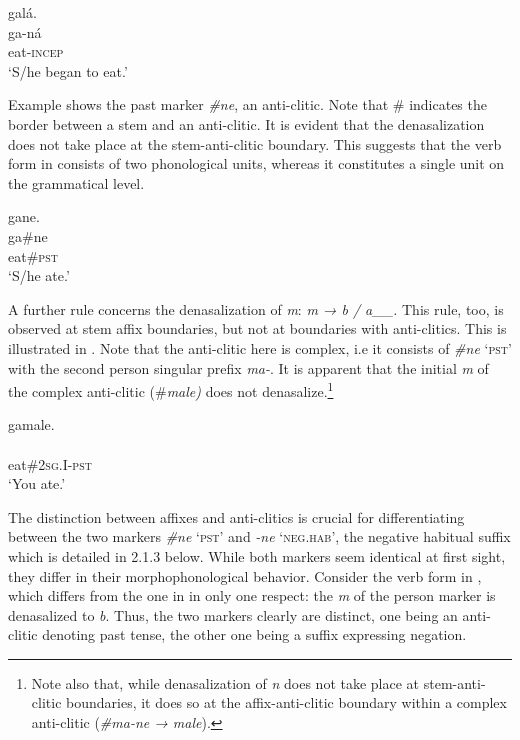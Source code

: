 \documentclass[output=paper,colorlinks,citecolor=brown]{langscibook}
\begin{document}
\ea\label{ex:kog:1} {galá}.\\    
    \gll ga-ná\\
        eat-\textsc{incep}\\
    \glt‘S/he began to eat.'
\z 

Example  shows the past marker \textit{\#ne}, an anti-clitic. Note that \# indicates the border between a stem and an anti-clitic. It is evident that the denasalization does not take place at the stem-anti-clitic boundary. This suggests that the verb form in  consists of two phonological units, whereas it constitutes a single unit on the grammatical level.

\ea\label{ex:kog:2}{gane}.\\
    \gll ga\#ne\\
         eat\#\textsc{pst}\\
    \glt  ‘S/he ate.’
\z 

A further rule concerns the denasalization of \textit{m}: \textit{m → b / a\_\_.} This rule, too, is observed at stem affix boundaries, but not at boundaries with anti-clitics. This is illustrated in . Note that the anti-clitic here is complex, i.e it consists of \textit{\#ne} ‘\textsc{pst’} with the second person singular prefix \textit{ma-}. It is apparent that the initial \textit{m} of the complex anti-clitic (\#\textit{male)} does not denasalize.\footnote{Note also that, while denasalization of \textit{n} does not take place at stem-anti-clitic boundaries, it does so at the affix-anti-clitic boundary within a complex anti-clitic (\textit{\#ma-ne → male}).}

\ea\label{ex:kog:3}{gamale}.\\
    \\
         eat\#2\textsc{sg.I-pst}\\
    \glt  ‘You ate.’
\z 

The distinction between affixes and anti-clitics is crucial for differentiating between the two markers \textit{\#ne} ‘\textsc{pst’} and \textit{{}-ne} ‘\textsc{neg.hab}’, the negative habitual suffix which is detailed in 2.1.3 below. While both markers seem identical at first sight, they differ in their morphophonological behavior. Consider the verb form in , which differs from the one in  in only one respect: the \textit{m} of the person marker is denasalized to \textit{b}. Thus, the two markers clearly are distinct, one being an anti-clitic denoting past tense, the other one being a suffix expressing negation.
\end{document}
